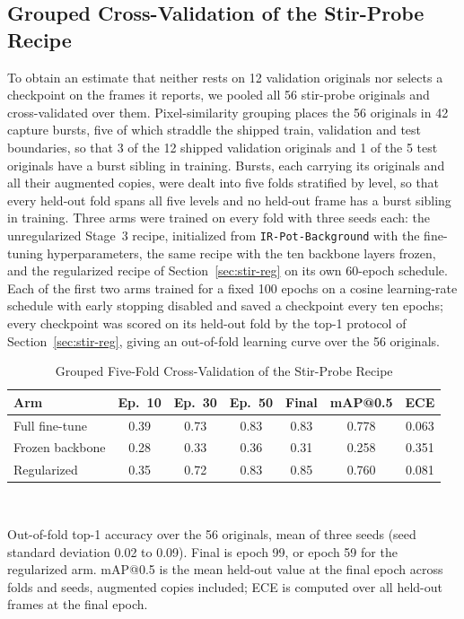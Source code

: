 ﻿\documentclass[journal]{IEEEtran}
\begin{document}
\subsection{Grouped Cross-Validation of the Stir-Probe Recipe}
\label{sec:stir-cv}
To obtain an estimate that neither rests on 12 validation originals nor selects a checkpoint on the frames it reports, we pooled all 56 stir-probe originals and cross-validated over them. Pixel-similarity grouping places the 56 originals in 42 capture bursts, five of which straddle the shipped train, validation and test boundaries, so that 3 of the 12 shipped validation originals and 1 of the 5 test originals have a burst sibling in training. Bursts, each carrying its originals and all their augmented copies, were dealt into five folds stratified by level, so that every held-out fold spans all five levels and no held-out frame has a burst sibling in training. Three arms were trained on every fold with three seeds each: the unregularized Stage~3 recipe, initialized from \texttt{IR-Pot-Background} with the fine-tuning hyperparameters, the same recipe with the ten backbone layers frozen, and the regularized recipe of Section~\ref{sec:stir-reg} on its own 60-epoch schedule. Each of the first two arms trained for a fixed 100 epochs on a cosine learning-rate schedule with early stopping disabled and saved a checkpoint every ten epochs; every checkpoint was scored on its held-out fold by the top-1 protocol of Section~\ref{sec:stir-reg}, giving an out-of-fold learning curve over the 56 originals.

\begin{table}[!t]
\renewcommand{\arraystretch}{1.3}
\caption{Grouped Five-Fold Cross-Validation of the Stir-Probe Recipe}
\label{tab:stircv}
\centering
\footnotesize
\setlength{\tabcolsep}{3.5pt}
\begin{tabular}{l c c c c c c}
\toprule
\textbf{Arm} & \textbf{Ep.~10} & \textbf{Ep.~30} & \textbf{Ep.~50} & \textbf{Final} & \textbf{mAP@0.5} & \textbf{ECE} \\
\midrule
Full fine-tune & 0.39 & 0.73 & 0.83 & 0.83 & 0.778 & 0.063 \\
Frozen backbone & 0.28 & 0.33 & 0.36 & 0.31 & 0.258 & 0.351 \\
Regularized & 0.35 & 0.72 & 0.83 & 0.85 & 0.760 & 0.081 \\
\bottomrule
\end{tabular}
\\[2pt]
\parbox{\columnwidth}{\footnotesize Out-of-fold top-1 accuracy over the 56 originals, mean of three seeds (seed standard deviation 0.02 to 0.09). Final is epoch 99, or epoch 59 for the regularized arm. mAP@0.5 is the mean held-out value at the final epoch across folds and seeds, augmented copies included; ECE is computed over all held-out frames at the final epoch.}
\end{table}
\end{document}

